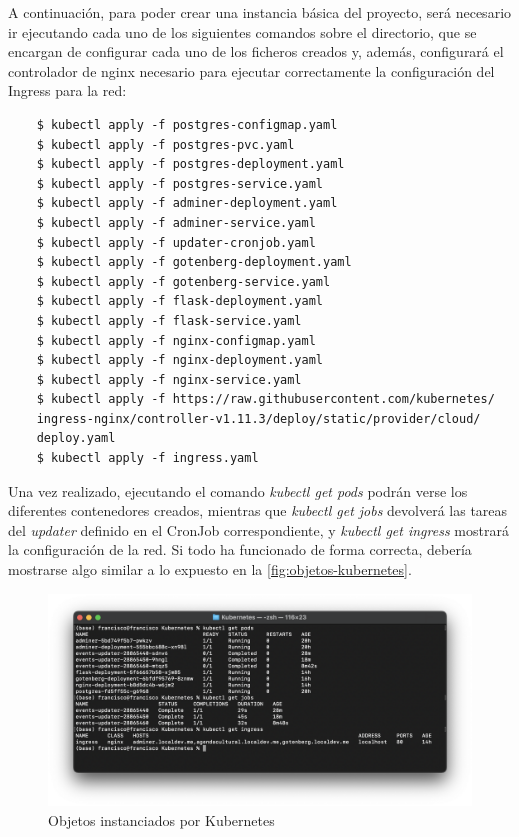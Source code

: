 \documentclass{report}
\begin{document}
            A continuación, para poder crear una instancia básica del proyecto, será necesario ir ejecutando cada uno de los siguientes comandos sobre el directorio, que se encargan de configurar cada uno de los ficheros creados y, además, configurará el controlador de nginx necesario para ejecutar correctamente la configuración del Ingress para la red:

            \begin{verbatim}
    $ kubectl apply -f postgres-configmap.yaml
    $ kubectl apply -f postgres-pvc.yaml
    $ kubectl apply -f postgres-deployment.yaml
    $ kubectl apply -f postgres-service.yaml
    $ kubectl apply -f adminer-deployment.yaml
    $ kubectl apply -f adminer-service.yaml
    $ kubectl apply -f updater-cronjob.yaml
    $ kubectl apply -f gotenberg-deployment.yaml
    $ kubectl apply -f gotenberg-service.yaml
    $ kubectl apply -f flask-deployment.yaml
    $ kubectl apply -f flask-service.yaml
    $ kubectl apply -f nginx-configmap.yaml
    $ kubectl apply -f nginx-deployment.yaml
    $ kubectl apply -f nginx-service.yaml
    $ kubectl apply -f https://raw.githubusercontent.com/kubernetes/
    ingress-nginx/controller-v1.11.3/deploy/static/provider/cloud/
    deploy.yaml
    $ kubectl apply -f ingress.yaml
            \end{verbatim}

            Una vez realizado, ejecutando el comando \textit{kubectl get pods} podrán verse los diferentes contenedores creados, mientras que \textit{kubectl get jobs} devolverá las tareas del \textit{updater} definido en el CronJob correspondiente, y \textit{kubectl get ingress} mostrará la configuración de la red. Si todo ha funcionado de forma correcta, debería mostrarse algo similar a lo expuesto en la \autoref{fig:objetos-kubernetes}.

            \begin{figure}[H]
                \centering
                \includegraphics[width=1\linewidth]{img/despliegue-kubernetes.png}
                \caption{Objetos instanciados por Kubernetes}
                \label{fig:objetos-kubernetes}
            \end{figure}
\end{document}
